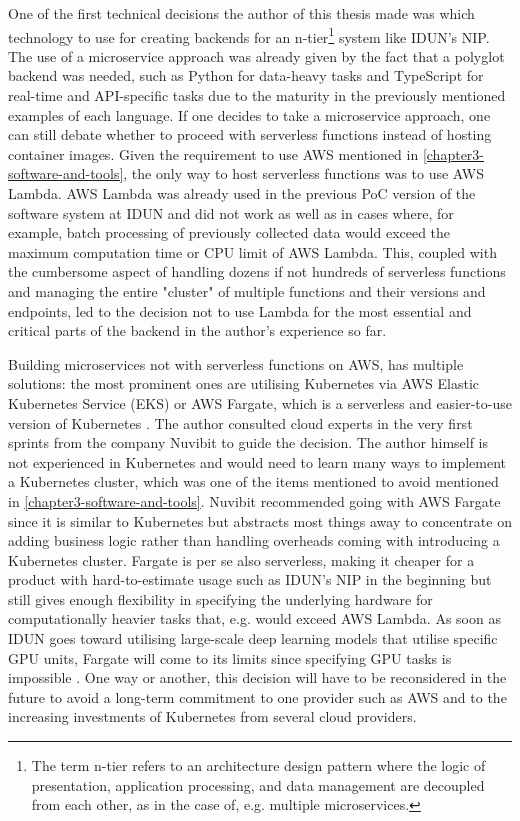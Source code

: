 One of the first technical decisions the author of this thesis made was which technology to use for creating backends for an n-tier\footnote{The term n-tier refers to an architecture design pattern where the logic of presentation, application processing, and data management are decoupled from each other, as in the case of, e.g. multiple microservices.} system like IDUN's NIP. The use of a microservice approach was already given by the fact that a polyglot backend was needed, such as Python for data-heavy tasks and TypeScript for real-time and API-specific tasks due to the maturity in the previously mentioned examples of each language. If one decides to take a microservice approach, one can still debate whether to proceed with serverless functions instead of hosting container images. Given the requirement to use AWS mentioned in \autoref{chapter3-software-and-tools}, the only way to host serverless functions was to use AWS Lambda. AWS Lambda was already used in the previous PoC version of the software system at IDUN and did not work as well as in cases where, for example, batch processing of previously collected data would exceed the maximum computation time or CPU limit of AWS Lambda. This, coupled with the cumbersome aspect of handling dozens if not hundreds of serverless functions and managing the entire "cluster" of multiple functions and their versions and endpoints, led to the decision not to use Lambda for the most essential and critical parts of the backend in the author's experience so far.

Building microservices not with serverless functions on AWS, has multiple solutions: the most prominent ones are utilising Kubernetes via AWS Elastic Kubernetes Service (EKS) or AWS Fargate, which is a serverless and easier-to-use version of Kubernetes \citep{aws_serverless_nodate}. The author consulted cloud experts in the very first sprints from the company Nuvibit to guide the decision. The author himself is not experienced in Kubernetes and would need to learn many ways to implement a Kubernetes cluster, which was one of the items mentioned to avoid mentioned in \autoref{chapter3-software-and-tools}. Nuvibit recommended going with AWS Fargate since it is similar to Kubernetes but abstracts most things away to concentrate on adding business logic rather than handling overheads coming with introducing a Kubernetes cluster. Fargate is per se also serverless, making it cheaper for a product with hard-to-estimate usage such as IDUN's NIP in the beginning but still gives enough flexibility in specifying the underlying hardware for computationally heavier tasks that, e.g. would exceed AWS Lambda. As soon as IDUN goes toward utilising large-scale deep learning models that utilise specific GPU units, Fargate will come to its limits since specifying GPU tasks is impossible \citep{aws_aws_2019}. One way or another, this decision will have to be reconsidered in the future to avoid a long-term commitment to one provider such as AWS and to the increasing investments of Kubernetes from several cloud providers.

